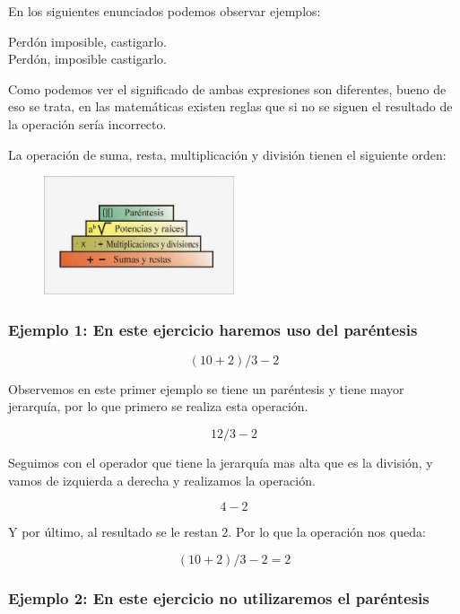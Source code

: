 \documentclass[11pt]{book}
\begin{document}
En los siguientes enunciados podemos observar ejemplos:
\begin{center}
  \begin{minipage}{0.4\textwidth}
    \begin{bA}
      Perdón imposible, castigarlo.\\
      Perdón, imposible castigarlo.
    \end{bA}
  \end{minipage}
\end{center}

Como podemos ver el significado de ambas expresiones son diferentes, bueno de eso se trata, en las matemáticas
existen reglas que si no se siguen el resultado de la operación sería incorrecto.

La operación de suma, resta, multiplicación y división tienen el siguiente orden:
\begin{figure}[H]
  \centering
  \includegraphics[width=0.5\textwidth]{./Unidad 2/Images/jerarquia.jpg}
\end{figure}

\subsubsection{Ejemplo 1: En este ejercicio haremos uso del paréntesis}

\[( 10 + 2 ) / 3 - 2\]

Observemos en este primer ejemplo se tiene un paréntesis y tiene mayor jerarquía, por lo que primero se realiza
esta operación.

\[12 / 3 - 2\]

Seguimos con el operador que tiene la jerarquía mas alta que es la división, y vamos de izquierda a derecha y
realizamos la operación.

\[4 - 2\]

Y por último, al resultado se le restan 2. Por lo que la operación nos queda:

\[( 10 + 2 ) / 3 - 2 = 2\]



\subsubsection{Ejemplo 2: En este ejercicio no utilizaremos el paréntesis}
\end{document}
